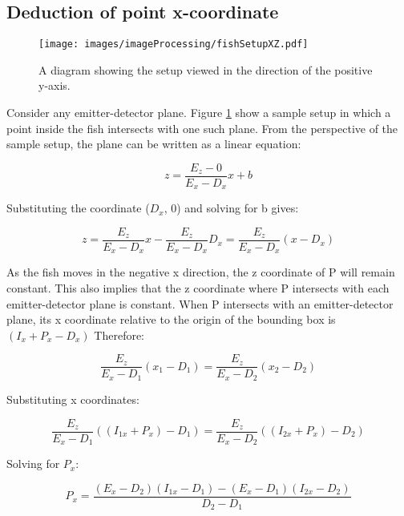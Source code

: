 \subsection{Deduction of point x-coordinate}

\begin{figure}
	\centering
	\texttt{[image: images/imageProcessing/fishSetupXZ.pdf]}
	\caption{A diagram showing the setup viewed in the direction of the positive y-axis.}
	\label{fig:fishSetupXZ}
\end{figure}

Consider any emitter-detector plane. Figure \ref{fig:fishSetupXZ} show a sample setup in which a point inside the fish intersects with one such plane. From the perspective of the sample setup, the plane can be written as a linear equation:

\begin{equation}
z = \frac{E_z - 0}{E_x - D_x}x + b
\end{equation}

Substituting the coordinate ($D_x$, 0) and solving for b gives:

\begin{equation}
z = \frac{E_z}{E_x - D_x}x - \frac{E_z}{E_x - D_x}D_x = \frac{E_z}{E_x - D_x}(x - D_x)
\end{equation}

As the fish moves in the negative x direction, the z coordinate of P will remain constant. This also implies that the z coordinate where P intersects with each emitter-detector plane is constant. When P intersects with an emitter-detector plane, its x coordinate relative to the origin of the bounding box is $(I_x + P_x - D_x)$ Therefore:

\begin{equation}
\frac{E_z}{E_x - D_1}(x_1 - D_1) = \frac{E_z}{E_x - D_2}(x_2 - D_2)
\end{equation}

Substituting x coordinates:

\begin{equation}
\frac{E_z}{E_x - D_1}((I_{1x} + P_x) - D_1) = \frac{E_z}{E_x - D_2}((I_{2x} + P_x) - D_2)
\end{equation}

Solving for $P_x$:

\begin{equation}
P_x = \frac{(E_x - D_2)(I_{1x} - D_1) - (E_x - D_1)(I_{2x} - D_2)}{D_2 - D_1}
\end{equation}

